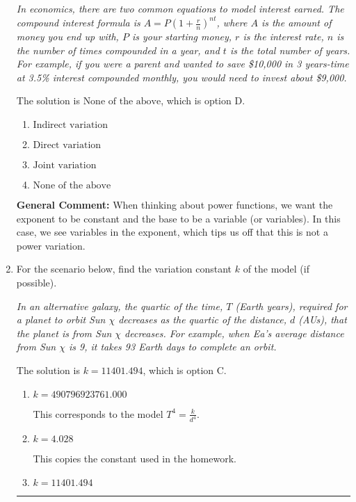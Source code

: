 \documentclass{extbook}[14pt]
\newcommand{\litem}[1]{\item #1

\rule{\textwidth}{0.4pt}}
\begin{document}
\begin{enumerate}
{\begin{center}
    \textit{ In economics, there are two common equations to model interest earned. The compound interest formula is $A = P (1 + \frac{r}{n})^{nt}$, where $A$ is the amount of money you end up with, $P$ is your starting money, $r$ is the interest rate, $n$ is the number of times compounded in a year, and $t$ is the total number of years. For example, if you were a parent and wanted to save \$10,000 in 3 years-time at 3.5\% interest compounded monthly, you would need to invest about \$9,000. }
\end{center}
The solution is \( \text{None of the above} \), which is option D.\begin{enumerate}[label=\Alph*.]
\item \( \text{Indirect variation} \)


\item \( \text{Direct variation} \)


\item \( \text{Joint variation} \)


\item \( \text{None of the above} \)


\end{enumerate}

\textbf{General Comment:} When thinking about power functions, we want the exponent to be constant and the base to be a variable (or variables). In this case, we see variables in the exponent, which tips us off that this is not a power variation.
}
\litem{
For the scenario below, find the variation constant $k$ of the model (if possible).

\begin{center}
    \textit{ In an alternative galaxy, the quartic of the time, $T$ (Earth years), required for a planet to orbit Sun $\chi$ decreases as the quartic of the distance, $d$ (AUs), that the planet is from Sun $\chi$ decreases. For example, when Ea's average distance from Sun $\chi$ is 9, it takes 93 Earth days to complete an orbit. }
\end{center}
The solution is \( k = 11401.494 \), which is option C.\begin{enumerate}[label=\Alph*.]
\item \( k = 490796923761.000 \)

This corresponds to the model $T^{4} = \frac{k}{d^{4}}$.
\item \( k = 4.028 \)

This copies the constant used in the homework.
\item \( k = 11401.494 \)


\end{enumerate}}
\end{enumerate}
\end{document}
